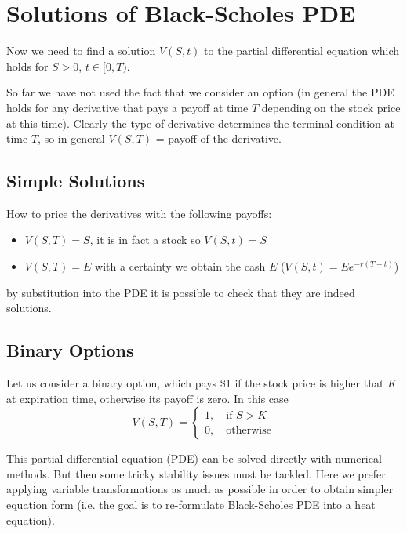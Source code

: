 \section{Solutions of Black-Scholes PDE}
Now we need to find a solution $V(S, t)$ to the partial differential equation which holds for $S >0$, $t \in [0, T)$.

So far we have not used the fact that we consider an option (in general the PDE holds for any derivative that pays a payoff at time $T$ depending on the stock price at this time).
Clearly the type of derivative determines the terminal condition at time $T$, so in general $V(S, T)$ = payoff of the derivative.

\subsection{Simple Solutions}
How to price the derivatives with the following payoffs:
\begin{itemize}
\tightlist
\item $V(S, T) = S$, it is in fact a stock so $V(S, t) = S$
\item $V(S, T) = E$ with a certainty we obtain the cash $E$ ($V(S, t) = Ee^{−r(T−t)}$)
\end{itemize}
by substitution into the PDE it is possible to check that they are indeed solutions.



\subsection{Binary Options}
Let us consider a binary option, which pays \$1 if the stock price is higher that $K$ at expiration time, otherwise its payoff is zero.
In this case
\begin{equation}
V(S, T) = 
	\begin{cases}
		1, \quad\textrm{if }S > K\\
		0, \quad\textrm{otherwise}	
	\end{cases}
\end{equation}

This partial differential equation (PDE) can be solved directly with numerical methods. But then some tricky stability issues must be tackled. Here we prefer applying variable transformations as much as possible in order to obtain simpler equation form (i.e. the goal is to re-formulate Black-Scholes PDE into a heat equation).


